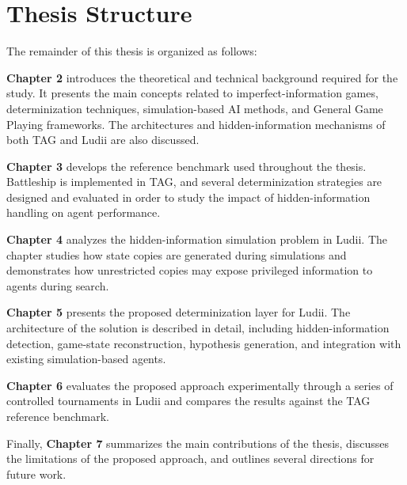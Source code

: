 \section{Thesis Structure}
The remainder of this thesis is organized as follows:

\textbf{Chapter 2} introduces the theoretical and technical background required for the study. It presents the main concepts related to imperfect-information games, determinization techniques, simulation-based AI methods, and General Game Playing frameworks. The architectures and hidden-information mechanisms of both TAG and Ludii are also discussed.

\textbf{Chapter 3} develops the reference benchmark used throughout the thesis. Battleship is implemented in TAG, and several determinization strategies are designed and evaluated in order to study the impact of hidden-information handling on agent performance.

\textbf{Chapter 4} analyzes the hidden-information simulation problem in Ludii. The chapter studies how state copies are generated during simulations and demonstrates how unrestricted copies may expose privileged information to agents during search.

\textbf{Chapter 5} presents the proposed determinization layer for Ludii. The architecture of the solution is described in detail, including hidden-information detection, game-state reconstruction, hypothesis generation, and integration with existing simulation-based agents.

\textbf{Chapter 6} evaluates the proposed approach experimentally through a series of controlled tournaments in Ludii and compares the results against the TAG reference benchmark.

Finally, \textbf{Chapter 7} summarizes the main contributions of the thesis, discusses the limitations of the proposed approach, and outlines several directions for future work.